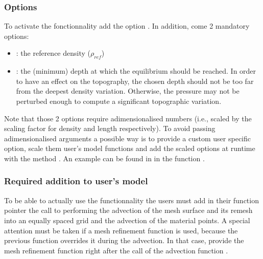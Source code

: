 \subsubsection*{Options} %
\label{ssub:options}
To activate the fonctionnality add the option .
In addition, come 2 mandatory options:
\begin{itemize}
  \item[\textbullet] : the reference density ($\rho_{ref}$)  
  \item[\textbullet] : the (minimum) depth at which the equilibrium should be reached. In order to have an effect on the topography, the chosen depth should not be too far from the deepest density variation. Otherwise, the pressure may not be perturbed enough to compute a significant topographic variation. 
\end{itemize}
Note that those 2 options require adimensionalised numbers (i.e., scaled by the scaling factor for density and length respectively).
To avoid passing adimensionalised arguments a possible way is to provide a custom user specific option, scale them user's model functions and add the scaled options at runtime with the {\PETSc} method .
An example can be found in  in the function .

\subsubsection*{Required addition to user's model} %
\label{ssub:required_addition_to_user_s_model}
To be able to actually use the functionnality the users must add in their  function pointer the call to  performing the advection of the mesh surface and its remesh into an equally spaced grid and the advection of the material points. 
A special attention must be taken if a mesh refinement function is used, because the previous function overrides it during the advection.
In that case, provide the mesh refinement function right after the call of the advection function .

